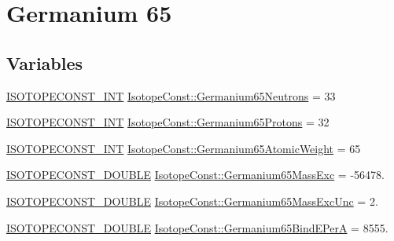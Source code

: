 \hypertarget{group___isotope_const-_germanium-_ge65}{}\section{Germanium 65}
\label{group___isotope_const-_germanium-_ge65}
\subsection*{Variables}
\begin{DoxyCompactItemize}
\item 
\mbox{\hyperlink{group___isotope_const-_macros_ga5f18360b3e99483a35c32d789e62621c}{I\+S\+O\+T\+O\+P\+E\+C\+O\+N\+S\+T\+\_\+\+I\+NT}} \mbox{\hyperlink{group___isotope_const-_germanium-_ge65_ga3ba8dd99223de5ffade88289d132fc2b}{Isotope\+Const\+::\+Germanium65\+Neutrons}} = 33
\item 
\mbox{\hyperlink{group___isotope_const-_macros_ga5f18360b3e99483a35c32d789e62621c}{I\+S\+O\+T\+O\+P\+E\+C\+O\+N\+S\+T\+\_\+\+I\+NT}} \mbox{\hyperlink{group___isotope_const-_germanium-_ge65_ga224e1a4dc5f4e311405a358a7e8b985e}{Isotope\+Const\+::\+Germanium65\+Protons}} = 32
\item 
\mbox{\hyperlink{group___isotope_const-_macros_ga5f18360b3e99483a35c32d789e62621c}{I\+S\+O\+T\+O\+P\+E\+C\+O\+N\+S\+T\+\_\+\+I\+NT}} \mbox{\hyperlink{group___isotope_const-_germanium-_ge65_ga1ee8db66aaea959429894ea7b5b87a8d}{Isotope\+Const\+::\+Germanium65\+Atomic\+Weight}} = 65
\item 
\mbox{\hyperlink{group___isotope_const-_macros_ga8f45a7272ce02c0b4c65c44636ed719a}{I\+S\+O\+T\+O\+P\+E\+C\+O\+N\+S\+T\+\_\+\+D\+O\+U\+B\+LE}} \mbox{\hyperlink{group___isotope_const-_germanium-_ge65_gafbdf37f9741c9bef3a9d29563d44674e}{Isotope\+Const\+::\+Germanium65\+Mass\+Exc}} = -\/56478.
\item 
\mbox{\hyperlink{group___isotope_const-_macros_ga8f45a7272ce02c0b4c65c44636ed719a}{I\+S\+O\+T\+O\+P\+E\+C\+O\+N\+S\+T\+\_\+\+D\+O\+U\+B\+LE}} \mbox{\hyperlink{group___isotope_const-_germanium-_ge65_ga58a14f6f35c6e36b49faeefadda2c62f}{Isotope\+Const\+::\+Germanium65\+Mass\+Exc\+Unc}} = 2.
\item 
\mbox{\hyperlink{group___isotope_const-_macros_ga8f45a7272ce02c0b4c65c44636ed719a}{I\+S\+O\+T\+O\+P\+E\+C\+O\+N\+S\+T\+\_\+\+D\+O\+U\+B\+LE}} \mbox{\hyperlink{group___isotope_const-_germanium-_ge65_gacd489aef011ae49eefe313dc77036e36}{Isotope\+Const\+::\+Germanium65\+Bind\+E\+PerA}} = 8555.
\item 

\end{DoxyCompactItemize}
